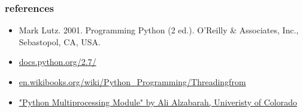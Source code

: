 \documentclass{beamer}
\begin{document}
\begin{frame}
 \frametitle{references}
 \begin{itemize}
  \item Mark Lutz. 2001. Programming Python (2 ed.). O'Reilly \& Associates, Inc., Sebastopol, CA, USA.
  \item \href{https://docs.python.org/2.7/}{docs.python.org/2.7/}
  \item \href{http://en.wikibooks.org/wiki/Python_Programming/Threadingfrom}{en.wikibooks.org/wiki/Python\_Programming/Threadingfrom}
  \item \href{http://www.cs.colorado.edu/~kena/classes/5828/s10/presentations/ali_alzabarah_se_presentati.pdf}{"Python Multiprocessing
Module" by Ali Alzabarah, Univeristy of Colorado}
 \end{itemize}
\end{frame}
	







%
\end{document}
